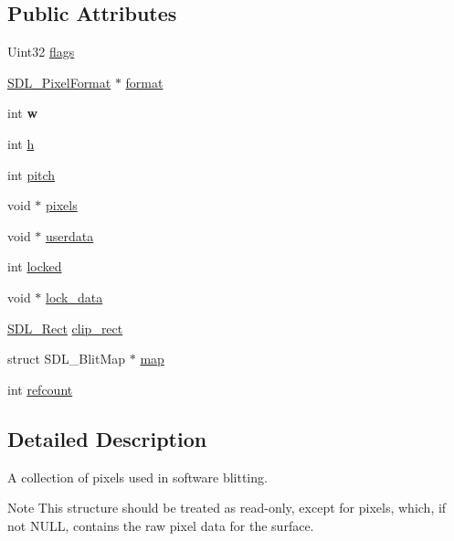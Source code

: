 \subsection*{Public Attributes}
\begin{DoxyCompactItemize}
\item 
Uint32 \hyperlink{structSDL__Surface_a86d78b665d5dfd7aa1dd9696b067641b}{flags}
\item 
\hyperlink{structSDL__PixelFormat}{S\+D\+L\+\_\+\+Pixel\+Format} $\ast$ \hyperlink{structSDL__Surface_a0a90721f947c10c3b79e02ccb419ca62}{format}
\item 
\mbox{\label{structSDL__Surface_a9b0ec7185dcdb2a3530a9160a6ea83d9}} 
int {\bfseries w}
\item 
int \hyperlink{structSDL__Surface_af33bcf87a1f5e10a99b3c7e8626b38c8}{h}
\item 
int \hyperlink{structSDL__Surface_a5fa37325d77d65b2ed64ffc7cd01bb6c}{pitch}
\item 
void $\ast$ \hyperlink{structSDL__Surface_abd9597e0e084b8ef33fe0397bc26d911}{pixels}
\item 
void $\ast$ \hyperlink{structSDL__Surface_ae66d973dcb9b57cb34815892e1ee1f31}{userdata}
\item 
int \hyperlink{structSDL__Surface_a5022edaeea1c0a055fa5d6dccba41de2}{locked}
\item 
void $\ast$ \hyperlink{structSDL__Surface_a0afacfb933b54a9af0846a307a6924fb}{lock\+\_\+data}
\item 
\hyperlink{structSDL__Rect}{S\+D\+L\+\_\+\+Rect} \hyperlink{structSDL__Surface_aa9a0da3b38261dad6cf0cc4e3bb5b0c3}{clip\+\_\+rect}
\item 
struct S\+D\+L\+\_\+\+Blit\+Map $\ast$ \hyperlink{structSDL__Surface_a8c1ecad399b0d4f525b1a53b6ee9393f}{map}
\item 
int \hyperlink{structSDL__Surface_a03d10628a359c0674f5ceffd574f1641}{refcount}
\end{DoxyCompactItemize}


\subsection{Detailed Description}
A collection of pixels used in software blitting. 

\begin{DoxyNote}{Note}
This structure should be treated as read-\/only, except for {\ttfamily pixels}, which, if not N\+U\+LL, contains the raw pixel data for the surface. 
\end{DoxyNote}


